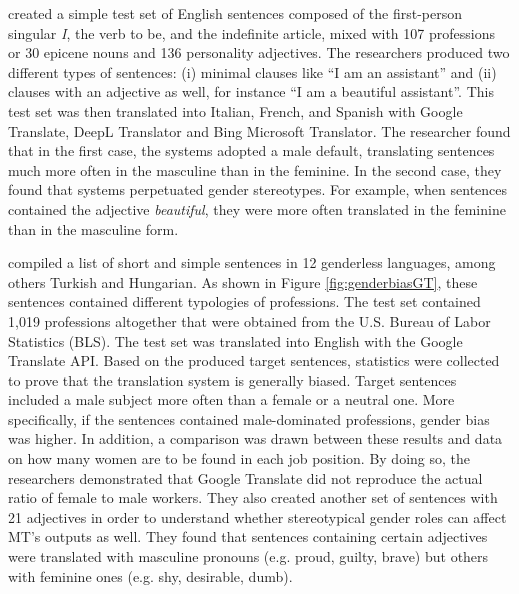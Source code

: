 \textcite{rescigno2020gender} created a simple test set of English sentences composed of the first-person singular \textit{I}, the verb to be, and the indefinite article, mixed with 107 professions or 30 epicene nouns and 136 personality adjectives. The researchers produced two different types of sentences: (i) minimal clauses like ``I am an assistant'' and (ii) clauses with an adjective as well, for instance ``I am a beautiful assistant''. This test set was then translated into Italian, French, and Spanish with Google Translate, DeepL Translator and Bing Microsoft Translator. The researcher found that in the first case, the systems adopted a male default, translating sentences much more often in the masculine than in the feminine. In the second case, they found that systems perpetuated gender stereotypes. For example, when sentences contained the adjective \textit{beautiful}, they were more often translated in the feminine than in the masculine form. 



\textcite{prates2019assessing} compiled a list of short and simple sentences in 12 genderless languages, among others Turkish and Hungarian. As shown in Figure \ref{fig:genderbiasGT}, these sentences contained different typologies of professions. The test set contained 1,019 professions altogether that were obtained from the U.S. Bureau of Labor Statistics (BLS). The test set was translated into English with the Google Translate API. Based on the produced target sentences, statistics were collected to prove that the translation system is generally biased. Target sentences included a male subject more often than a female or a neutral one. More specifically, if the sentences contained male-dominated professions, gender bias was higher. In addition, a comparison was drawn between these results and data on how many women are to be found in each job position. By doing so, the researchers demonstrated that Google Translate did not reproduce the actual ratio of female to male workers. They also created another set of sentences with 21 adjectives in order to understand whether stereotypical gender roles can affect MT’s outputs as well. They found that sentences containing certain adjectives were translated with masculine pronouns (e.g. proud, guilty, brave) but others with feminine ones (e.g. shy, desirable, dumb).

